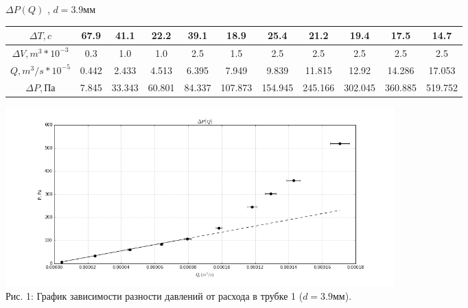 \documentclass[10pt]{article}
\begin{document}
\begin{enumerate}
    
                    \begin{center}
                    $\Delta P (Q)$ , $d = 3.9$мм
                    \begin{tabular}{|c|c|c|c|c|c|c|c|c|c|c|}
                            \hline
                                $\Delta T , c$ & 67.9& 41.1& 22.2& 39.1& 18.9& 25.4& 21.2& 19.4& 17.5& 14.7 \\
                            \hline
                                 $\Delta V , m^3 * 10^{-3}$   & 0.3& 1.0& 1.0& 2.5& 1.5& 2.5& 2.5& 2.5& 2.5& 2.5 \\
                            \hline
                                $Q , m^3/s * 10^{-5}$ &0.442&2.433&4.513&6.395&7.949&9.839&11.815&12.92&14.286&17.053\\
                            \hline
                                $\Delta P , \text{Па}$ &7.845&33.343&60.801&84.337&107.873&154.945&245.166&302.045&360.885&519.752\\
                            \hline
                        \end{tabular}
                        \includegraphics[width=15cm]{g1mm.png}
                    \\ Рис. 1: График зависимости разности давлений от расхода в трубке 1 ($d = 3.9$мм).
                    \end{center}


\end{enumerate}
\end{document}
